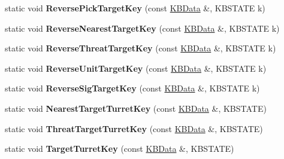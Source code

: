 \begin{DoxyCompactItemize}
\item 
static void {\bfseries Reverse\+Pick\+Target\+Key} (const \hyperlink{classKBData}{K\+B\+Data} \&, K\+B\+S\+T\+A\+TE k)\hypertarget{classFireKeyboard_a3b68d8886323c2ff7e1ab9dccf215f86}{}\label{classFireKeyboard_a3b68d8886323c2ff7e1ab9dccf215f86}

\item 
static void {\bfseries Reverse\+Nearest\+Target\+Key} (const \hyperlink{classKBData}{K\+B\+Data} \&, K\+B\+S\+T\+A\+TE k)\hypertarget{classFireKeyboard_a6a7c94feb2d9a0adffd33baf36472ddb}{}\label{classFireKeyboard_a6a7c94feb2d9a0adffd33baf36472ddb}

\item 
static void {\bfseries Reverse\+Threat\+Target\+Key} (const \hyperlink{classKBData}{K\+B\+Data} \&, K\+B\+S\+T\+A\+TE k)\hypertarget{classFireKeyboard_a17821603743ee1a9b9715abb16b3f482}{}\label{classFireKeyboard_a17821603743ee1a9b9715abb16b3f482}

\item 
static void {\bfseries Reverse\+Unit\+Target\+Key} (const \hyperlink{classKBData}{K\+B\+Data} \&, K\+B\+S\+T\+A\+TE k)\hypertarget{classFireKeyboard_a2afbd2d0f6155976164aee03c51b3eb7}{}\label{classFireKeyboard_a2afbd2d0f6155976164aee03c51b3eb7}

\item 
static void {\bfseries Reverse\+Sig\+Target\+Key} (const \hyperlink{classKBData}{K\+B\+Data} \&, K\+B\+S\+T\+A\+TE k)\hypertarget{classFireKeyboard_a5022b5667699d92e66876814984fdbfc}{}\label{classFireKeyboard_a5022b5667699d92e66876814984fdbfc}

\item 
static void {\bfseries Nearest\+Target\+Turret\+Key} (const \hyperlink{classKBData}{K\+B\+Data} \&, K\+B\+S\+T\+A\+TE)\hypertarget{classFireKeyboard_a6ca0411b74103ed55fea7ab35433203e}{}\label{classFireKeyboard_a6ca0411b74103ed55fea7ab35433203e}

\item 
static void {\bfseries Threat\+Target\+Turret\+Key} (const \hyperlink{classKBData}{K\+B\+Data} \&, K\+B\+S\+T\+A\+TE)\hypertarget{classFireKeyboard_ad3cc1ab59495d1aed2276674fcaaaaea}{}\label{classFireKeyboard_ad3cc1ab59495d1aed2276674fcaaaaea}

\item 
static void {\bfseries Target\+Turret\+Key} (const \hyperlink{classKBData}{K\+B\+Data} \&, K\+B\+S\+T\+A\+TE)\hypertarget{classFireKeyboard_af1fe84e7e5007a1ecf568b09f3057bb4}{}\label{classFireKeyboard_af1fe84e7e5007a1ecf568b09f3057bb4}


\end{DoxyCompactItemize}
